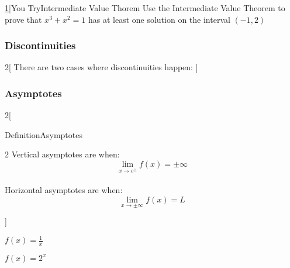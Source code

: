 \documentclass{MathNotes}
\newenvironment{definition}[1]{\begin{RedBox}{Definition}{#1}}{\end{RedBox}}
\newenvironment{practice}[2]{\begin{PurpleBox}{\texorpdfstring{#1}\Big|You Try}{#2}}{\end{PurpleBox}}
\begin{document}
\begin{practice}{\hyperref[ans:intermediate-value-theorem]{1}}{Intermediate Value Thorem}\label{prac:intermediate-value-theorem}
	Use the Intermediate Value Theorem to prove that $x^3+x^2=1$ has at least
	one solution on the interval $ (-1, 2) $
\end{practice}

\subsubsection{Discontinuities}\label{sec:discontinuities}

\begin{center}
	\begin{multicols}{2}[
			There are two cases where discontinuities happen: 
		]
		
		
	\end{multicols}
\end{center}

\newpage
\subsubsection{Asymptotes}\label{sec:asymptotes}
\begin{multicols}{2}[
		\begin{definition}{Asymptotes}
			\begin{multicols}{2}{
					Vertical asymptotes are when:
					\begin{displaymath}
						\lim_{x\to c^\pm}f(x)=\pm\infty
					\end{displaymath}
					\\
				}
				{
					Horizontal asymptotes are when:
					\begin{displaymath}
						\lim_{x\to \pm\infty}f(x)=L
					\end{displaymath}
				}
			\end{multicols}
		\end{definition}
	]{
		\begin{center}
			
			$f(x)=\frac{1}{x}$
		\end{center}
	}
	{
		\begin{center}
			
			$f(x)=2^x$
		\end{center}
	}
\end{multicols}
\end{document}
